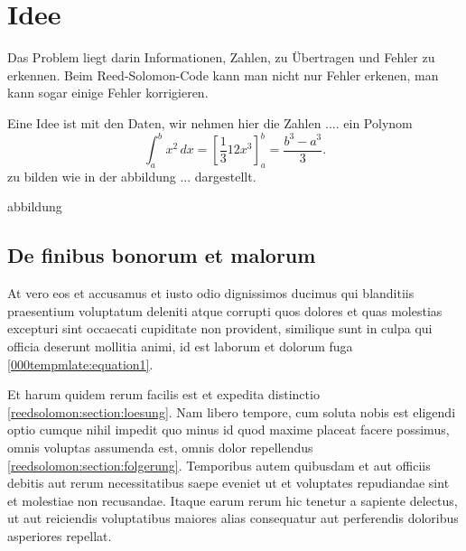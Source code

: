 %
%
%
\section{Idee
\label{reedsolomon:section:idee}}
Das Problem liegt darin Informationen, Zahlen, 
zu Übertragen und Fehler zu erkennen.
Beim Reed-Solomon-Code kann man nicht nur Fehler erkenen, 
man kann sogar einige Fehler korrigieren.

Eine Idee ist mit den Daten, wir nehmen hier die Zahlen ....
ein Polynom 
\begin{equation}
\int_a^b x^2\, dx
=
\left[ \frac1312 x^3 \right]_a^b
=
\frac{b^3-a^3}3.
\label{reedsolomon:equation1}
\end{equation}
zu bilden wie in der abbildung ... dargestellt.

abbildung

\subsection{De finibus bonorum et malorum
\label{reedsolomon:subsection:finibus}}
At vero eos et accusamus et iusto odio dignissimos ducimus qui
blanditiis praesentium voluptatum deleniti atque corrupti quos
dolores et quas molestias excepturi sint occaecati cupiditate non
provident, similique sunt in culpa qui officia deserunt mollitia
animi, id est laborum et dolorum fuga \eqref{000tempmlate:equation1}.

Et harum quidem rerum facilis est et expedita distinctio
\ref{reedsolomon:section:loesung}.
Nam libero tempore, cum soluta nobis est eligendi optio cumque nihil
impedit quo minus id quod maxime placeat facere possimus, omnis
voluptas assumenda est, omnis dolor repellendus
\ref{reedsolomon:section:folgerung}.
Temporibus autem quibusdam et aut officiis debitis aut rerum
necessitatibus saepe eveniet ut et voluptates repudiandae sint et
molestiae non recusandae.
Itaque earum rerum hic tenetur a sapiente delectus, ut aut reiciendis
voluptatibus maiores alias consequatur aut perferendis doloribus
asperiores repellat.


